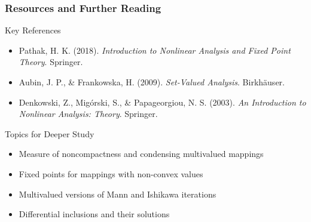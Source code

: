 \documentclass[aspectratio=169,10pt]{beamer}
\begin{document}
\begin{frame}
\frametitle{Resources and Further Reading}

\begin{block}{Key References}
\begin{itemize}
    \item Pathak, H. K. (2018). \textit{Introduction to Nonlinear Analysis and Fixed Point Theory}. Springer.

    \item Aubin, J. P., \& Frankowska, H. (2009). \textit{Set-Valued Analysis}. Birkhäuser.

    \item Denkowski, Z., Migórski, S., \& Papageorgiou, N. S. (2003). \textit{An Introduction to Nonlinear Analysis: Theory}. Springer.
\end{itemize}
\end{block}

\vspace{0.3cm}

\begin{block}{Topics for Deeper Study}
\begin{itemize}
    \item Measure of noncompactness and condensing multivalued mappings
    \item Fixed points for mappings with non-convex values
    \item Multivalued versions of Mann and Ishikawa iterations
    \item Differential inclusions and their solutions
\end{itemize}
\end{block}

\end{frame}
\end{document}
